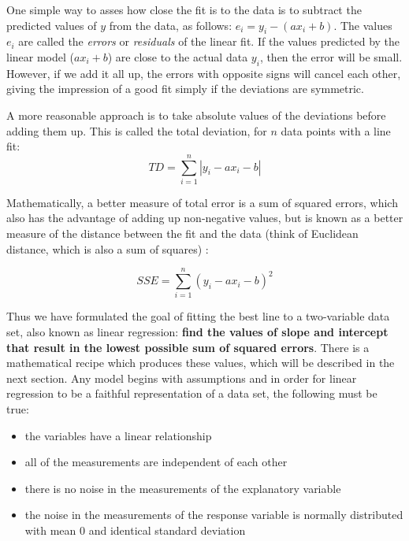 \documentclass[
  letterpaper,
  DIV=11,
  numbers=noendperiod]{scrreprt}
\begin{document}
One simple way to asses how close the fit is to the data is to subtract
the predicted values of \(y\) from the data, as follows:
\(e_i = y_i - (ax_i + b)\). The values \(e_i\) are called the
\emph{errors} or  \emph{residuals} of
the linear fit. If the values predicted by the linear model (\(ax_i+b\))
are close to the actual data \(y_i\), then the error will be small.
However, if we add it all up, the errors with opposite signs will cancel
each other, giving the impression of a good fit simply if the deviations
are symmetric.

A more reasonable approach is to take absolute values of the deviations
before adding them up. This is called the total deviation, for \(n\)
data points with a line fit:
\[ TD = \sum_{i=1}^n |  y_i - a x_i - b | \]

Mathematically, a better measure of total error is a sum of squared
errors, which also has the advantage of adding up non-negative values,
but is known as a better measure of the distance between the fit and the
data (think of Euclidean distance, which is also a sum of squares)
:

\[ SSE = \sum_{i=1}^n ( y_i -  a x_i - b )^2 \]

Thus we have formulated the goal of fitting the best line to a
two-variable data set, also known as linear regression: \textbf{find the
values of slope and intercept that result in the lowest possible sum of
squared errors}. There is a mathematical recipe which produces these
values, which will be described in the next section. Any model begins
with  assumptions and in order for
linear regression to be a faithful representation of a data set, the
following must be true:

\begin{itemize}
\item
  the variables have a linear relationship
\item
  all of the measurements are independent of each other
\item
  there is no noise in the measurements of the explanatory variable
\item
  the noise in the measurements of the response variable is normally
  distributed with mean 0 and identical standard deviation
\end{itemize}
\end{document}
